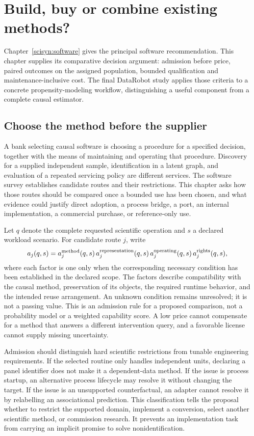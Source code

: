 \chapter{Build, buy or combine existing methods?}
\label{exec16:s10}

Chapter~\ref{scisyn:software} gives the principal software recommendation.
This chapter supplies its comparative decision argument: admission before
price, paired outcomes on the assigned population, bounded qualification and
maintenance-inclusive cost. The final DataRobot study applies those criteria
to a concrete propensity-modeling workflow, distinguishing a useful component
from a complete causal estimator.

\section{Choose the method before the supplier}

A bank selecting causal software is choosing a procedure for a specified
decision, together with the means of maintaining and operating that procedure.
Discovery for a supplied independent sample, identification in a latent graph,
and evaluation of a repeated servicing policy are different services. The
software survey establishes candidate routes and their restrictions. This
chapter asks how those routes should be compared once a bounded use has been
chosen, and what evidence could justify direct adoption, a process bridge, a
port, an internal implementation, a commercial purchase, or reference-only use.

Let \(q\) denote the complete requested scientific operation and \(s\) a
declared workload scenario. For candidate route \(j\), write
\[
 a_j(q,s)=a_j^{\rm method}(q,s)\,a_j^{\rm representation}(q,s)
          \,a_j^{\rm operating}(q,s)\,a_j^{\rm rights}(q,s),
\]
where each factor is one only when the corresponding necessary condition has
been established in the declared scope. The factors describe compatibility
with the causal method, preservation of its objects, the required runtime
behavior, and the intended reuse arrangement. An unknown condition remains
unresolved; it is not a passing value. This is an admission rule for a proposed
comparison, not a probability model or a weighted capability score. A low
price cannot compensate for a method that answers a different intervention
query, and a favorable license cannot supply missing uncertainty.
\citep{exec16_s10_design}

Admission should distinguish hard scientific restrictions from tunable
engineering requirements. If the selected routine only handles independent
units, declaring a panel identifier does not make it a dependent-data method.
If the issue is process startup, an alternative process lifecycle may resolve
it without changing the target. If the issue is an unsupported counterfactual,
an adapter cannot resolve it by relabelling an associational prediction. This
classification tells the proposal whether to restrict the supported domain,
implement a conversion, select another scientific method, or commission
research. It prevents an implementation task from carrying an implicit promise
to solve nonidentification.

